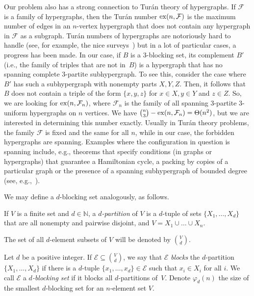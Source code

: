 \documentclass[11pt,a4paper]{article}
\begin{document}
Our problem also has a strong connection to Tur\'{a}n theory of hypergraphs. If $\mathcal{F}$ is a family of hypergraphs, then the Tur\'{a}n number ${\rm ex}(n,\mathcal{F})$ is the maximum number of edges in an $n$-vertex hypergraph that does not contain any hypergraph in $\mathcal{F}$ as a subgraph. Turán numbers of hypergraphs are notoriously hard to handle (see, for example, the nice surveys~\cite{Turan_type, Keevash}) but in a lot of particular cases, a progress has been made. In our case, if $B$ is a $3$-blocking set, its complement $B'$ (i.e., the family of triples that are not in~$B$) is a hypergraph that has no spanning complete $3$-partite subhypergraph. To see this, consider the case where $B'$ has such a subhypergraph with nonempty parts $X, Y, Z$. Then, it follows that $B$ does not contain a triple of the form $\{ x,y,z \}$ for $x \in X, y \in Y$ and $z \in Z$. So, we are looking for ${\rm ex}(n,\mathcal{F}_n)$, where $\mathcal{F}_n$ is the family of all spanning $3$-partite $3$-uniform hypergraphs on $n$ vertices. We have $\binom{n}{3} - {\rm ex}(n, \mathcal{F}_n)=\Theta(n^2)$, but we are interested in determining this number exactly. Usually in Tur\'{a}n theory problems, the family $\mathcal{F}$ is fixed and the same for all $n$, while in our case, the forbidden hypergraphs are spanning. Examples where the configuration in question is spanning include, e.g., theorems that specify conditions (in graphs or hypergraphs) that guarantee a Hamiltonian cycle, a packing by copies of a particular graph or the presence of a spanning subhypergraph of bounded degree (see, e.g.,~\cite{Kuhn_Osthus, Rodl_Ruc, alon_spanning}).


We may define a $d$-blocking set analogously, as follows.
\begin{definition}
If $V$ is a finite set and $d\in \mathbb{N}$, a {\em $d$-partition} of $V$ is a $d$-tuple of sets $\{X_1,\dots,X_d\}$ that are all nonempty and pairwise disjoint, and $V=X_1\cup\dots \cup X_n$.
\end{definition}

The set of all $d$-element subsets of $V$ will be denoted by $\binom{V}{d}$.
\begin{definition}
    Let $d$ be a positive integer. If $\mathcal{E}\subseteq \binom{V}{d}$, we say that $\mathcal{E}$ {\em blocks} the $d$-partition $\{X_1,\dots,X_d\}$ if there is a $d$-tuple $\{x_1,\dots,x_d\}\in \mathcal{E}$ such that $x_i\in X_i$ for all $i$. We call $\mathcal{E}$ a {\em $d$-blocking set} if it blocks all $d$-partitions of~$V$. Denote $\varphi_d(n)$ the size of the smallest $d$-blocking set for an $n$-element set $V$.
\end{definition}
\end{document}
